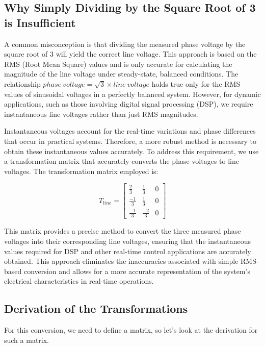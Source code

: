 \subsection{Why Simply Dividing by the Square Root of 3 is Insufficient}
A common misconception is that dividing the measured phase voltage by the
square root of 3 will yield the correct line voltage. This approach is based on
the RMS (Root Mean Square) values and is only accurate for calculating the
magnitude of the line voltage under steady-state, balanced conditions. The
relationship \(phase\ voltage = \sqrt{3} \times line\ voltage\) holds true only
for the RMS values of sinusoidal voltages in a perfectly balanced system.
However, for dynamic applications, such as those involving digital signal
processing (DSP), we require instantaneous line voltages rather than just RMS
magnitudes.

Instantaneous voltages account for the real-time variations and phase
differences that occur in practical systems. Therefore, a more robust method is
necessary to obtain these instantaneous values accurately. To address this
requirement, we use a transformation matrix that accurately converts the phase
voltages to line voltages. The transformation matrix employed is:

\begin{equation*}
    T_{line} =
    \begin{bmatrix}
        \frac{2}{3}  & \frac{1}{3}  & 0 \\
        \frac{-1}{3} & \frac{1}{3}  & 0 \\
        \frac{-1}{3} & \frac{-2}{3} & 0
    \end{bmatrix}
\end{equation*}

This matrix provides a precise method to convert the three measured phase
voltages into their corresponding line voltages, ensuring that the
instantaneous values required for DSP and other real-time control applications
are accurately obtained. This approach eliminates the inaccuracies associated
with simple RMS-based conversion and allows for a more accurate representation
of the system's electrical characteristics in real-time operations.

\subsection{Derivation of the Transformations}
For this conversion, we need to define a matrix, so let's look at the
derivation for such a matrix.

